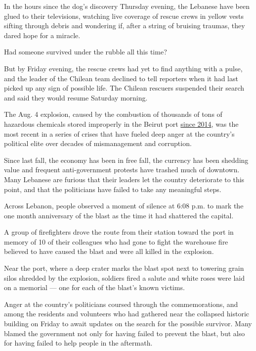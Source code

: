In the hours since the dog's discovery Thursday evening, the Lebanese
have been glued to their televisions, watching live coverage of rescue
crews in yellow vests sifting through debris and wondering if, after a
string of bruising traumas, they dared hope for a miracle.

Had someone survived under the rubble all this time?

But by Friday evening, the rescue crews had yet to find anything with a
pulse, and the leader of the Chilean team declined to tell reporters
when it had last picked up any sign of possible life. The Chilean
rescuers suspended their search and said they would resume Saturday
morning.

The Aug. 4 explosion, caused by the combustion of thousands of tons of
hazardous chemicals stored improperly in the Beirut port
\href{https://www.nytimes3xbfgragh.onion/2020/08/05/world/middleeast/beirut-explosion-ship.html}{since
2014}, was the most recent in a series of crises that have fueled deep
anger at the country's political elite over decades of mismanagement and
corruption.

Since last fall, the economy has been in free fall, the currency has
been shedding value and frequent anti-government protests have trashed
much of downtown. Many Lebanese are furious that their leaders let the
country deteriorate to this point, and that the politicians have failed
to take any meaningful steps.

Across Lebanon, people observed a moment of silence at 6:08 p.m. to mark
the one month anniversary of the blast as the time it had shattered the
capital.

A group of firefighters drove the route from their station toward the
port in memory of 10 of their colleagues who had gone to fight the
warehouse fire believed to have caused the blast and were all killed in
the explosion.

Near the port, where a deep crater marks the blast spot next to towering
grain silos shredded by the explosion, soldiers fired a salute and white
roses were laid on a memorial --- one for each of the blast's known
victims.

Anger at the country's politicians coursed through the commemorations,
and among the residents and volunteers who had gathered near the
collapsed historic building on Friday to await updates on the search for
the possible survivor. Many blamed the government not only for having
failed to prevent the blast, but also for having failed to help people
in the aftermath.

